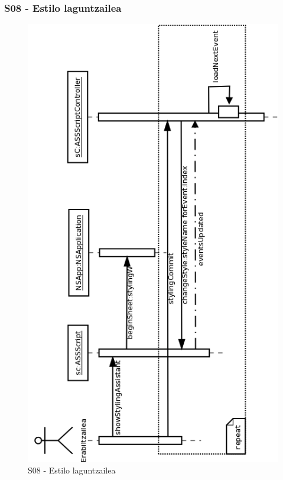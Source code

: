 \newpage
\subsubsection{S08 - Estilo laguntzailea}
\begin{figure}[htp]
\begin{center}
\includegraphics[scale=0.4]{Pictures/Chapter4/Diseinua/S08.png}
\caption{S08 - Estilo laguntzailea}
\label{s08d}
\end{center}
\end{figure}

\newpage
